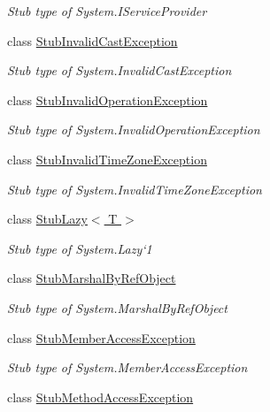 \begin{DoxyCompactItemize}
\begin{DoxyCompactList}\small\item\em Stub type of System.\-I\-Service\-Provider\end{DoxyCompactList}\item 
class \hyperlink{class_system_1_1_fakes_1_1_stub_invalid_cast_exception}{Stub\-Invalid\-Cast\-Exception}
\begin{DoxyCompactList}\small\item\em Stub type of System.\-Invalid\-Cast\-Exception\end{DoxyCompactList}\item 
class \hyperlink{class_system_1_1_fakes_1_1_stub_invalid_operation_exception}{Stub\-Invalid\-Operation\-Exception}
\begin{DoxyCompactList}\small\item\em Stub type of System.\-Invalid\-Operation\-Exception\end{DoxyCompactList}\item 
class \hyperlink{class_system_1_1_fakes_1_1_stub_invalid_time_zone_exception}{Stub\-Invalid\-Time\-Zone\-Exception}
\begin{DoxyCompactList}\small\item\em Stub type of System.\-Invalid\-Time\-Zone\-Exception\end{DoxyCompactList}\item 
class \hyperlink{class_system_1_1_fakes_1_1_stub_lazy_3_01_t_01_4}{Stub\-Lazy$<$ T $>$}
\begin{DoxyCompactList}\small\item\em Stub type of System.\-Lazy`1\end{DoxyCompactList}\item 
class \hyperlink{class_system_1_1_fakes_1_1_stub_marshal_by_ref_object}{Stub\-Marshal\-By\-Ref\-Object}
\begin{DoxyCompactList}\small\item\em Stub type of System.\-Marshal\-By\-Ref\-Object\end{DoxyCompactList}\item 
class \hyperlink{class_system_1_1_fakes_1_1_stub_member_access_exception}{Stub\-Member\-Access\-Exception}
\begin{DoxyCompactList}\small\item\em Stub type of System.\-Member\-Access\-Exception\end{DoxyCompactList}\item 
class \hyperlink{class_system_1_1_fakes_1_1_stub_method_access_exception}{Stub\-Method\-Access\-Exception}

\end{DoxyCompactItemize}
